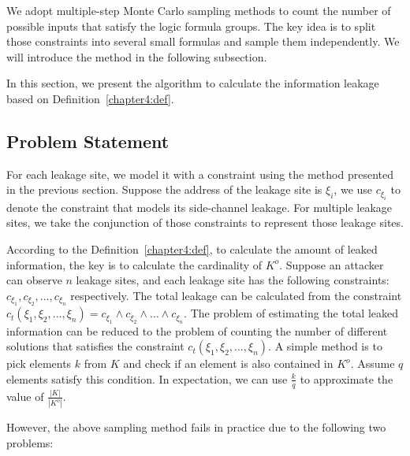 We adopt multiple-step Monte Carlo sampling methods to count the number of
possible inputs that satisfy the logic formula groups. The key idea is to split
those constraints into several small formulas and sample them independently.
We will introduce the method in the following subsection.


\newcommand{\addr}[1]{{l}_{#1}}
\renewcommand{\addr}[1]{{\gamma}_{#1}}
\renewcommand{\addr}[1]{{\zeta}_{#1}}
\renewcommand{\addr}[1]{{\xi}_{#1}}

In this section, we present the algorithm to calculate the information leakage based on Definition~\ref{chapter4:def}. 

\subsection{Problem Statement}
For each leakage site, we model it with a constraint using the
method presented in the previous section. Suppose the address of the leakage site is $\addr{i}$, we use $c_{\addr{i}}$ to denote the constraint that models its side-channel leakage. For multiple leakage sites, we take the conjunction of those constraints to represent those leakage sites.

According to the Definition~\ref{chapter4:def}, to calculate the amount of leaked
information, the key is to calculate the cardinality
of $K^o$. Suppose an attacker can observe $n$ leakage sites, and each leakage
site has the following constraints: $c_{\addr{1}}, c_{\addr{2}}, \ldots,
    c_{\addr{n}}$ respectively. The total leakage can be calculated from the constraint
$c_t({\addr{1}},{\addr{2}},\ldots,{\addr{n}}) = c_{\addr{1}} \land c_{\addr{2}}
    \land \ldots \land c_{\addr{n}}$.
The problem of estimating the total leaked
information can be reduced to the problem of counting the number of different
solutions that satisfies the constraint
$c_t({\addr{1}},{\addr{2}},\ldots,{\addr{n}})$.
A simple method is to pick elements $k$ from $K$ and check if an
element is also contained in $K^o$. Assume $q$ elements satisfy this condition. In
expectation, we can use $\frac{k}{q}$ to approximate the value of
$\frac{|K|}{|K^o|}$.

However, the above sampling method fails in practice due to the following two problems:

